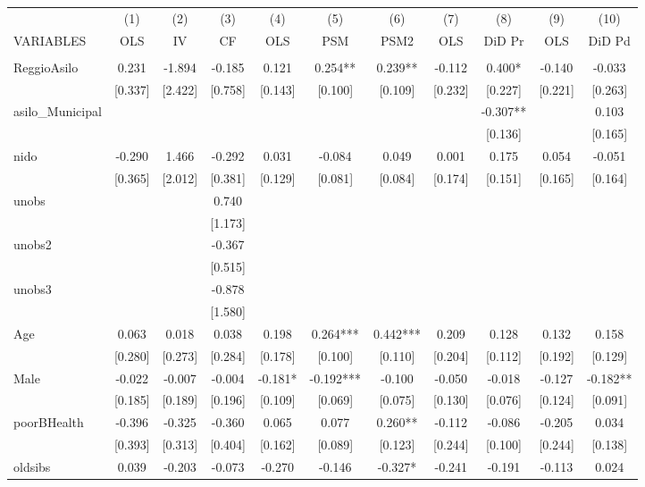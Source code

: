 \documentclass[]{article}
\begin{document}
\begin{tabular}{lcccccccccc} \hline
 & (1) & (2) & (3) & (4) & (5) & (6) & (7) & (8) & (9) & (10) \\
VARIABLES & OLS & IV & CF & OLS & PSM & PSM2 & OLS & DiD Pr & OLS & DiD Pd \\ \hline
 &  &  &  &  &  &  &  &  &  &  \\
ReggioAsilo & 0.231 & -1.894 & -0.185 & 0.121 & 0.254** & 0.239** & -0.112 & 0.400* & -0.140 & -0.033 \\
 & [0.337] & [2.422] & [0.758] & [0.143] & [0.100] & [0.109] & [0.232] & [0.227] & [0.221] & [0.263] \\
asilo\_Municipal &  &  &  &  &  &  &  & -0.307** &  & 0.103 \\
 &  &  &  &  &  &  &  & [0.136] &  & [0.165] \\
nido & -0.290 & 1.466 & -0.292 & 0.031 & -0.084 & 0.049 & 0.001 & 0.175 & 0.054 & -0.051 \\
 & [0.365] & [2.012] & [0.381] & [0.129] & [0.081] & [0.084] & [0.174] & [0.151] & [0.165] & [0.164] \\
unobs &  &  & 0.740 &  &  &  &  &  &  &  \\
 &  &  & [1.173] &  &  &  &  &  &  &  \\
unobs2 &  &  & -0.367 &  &  &  &  &  &  &  \\
 &  &  & [0.515] &  &  &  &  &  &  &  \\
unobs3 &  &  & -0.878 &  &  &  &  &  &  &  \\
 &  &  & [1.580] &  &  &  &  &  &  &  \\
Age & 0.063 & 0.018 & 0.038 & 0.198 & 0.264*** & 0.442*** & 0.209 & 0.128 & 0.132 & 0.158 \\
 & [0.280] & [0.273] & [0.284] & [0.178] & [0.100] & [0.110] & [0.204] & [0.112] & [0.192] & [0.129] \\
Male & -0.022 & -0.007 & -0.004 & -0.181* & -0.192*** & -0.100 & -0.050 & -0.018 & -0.127 & -0.182** \\
 & [0.185] & [0.189] & [0.196] & [0.109] & [0.069] & [0.075] & [0.130] & [0.076] & [0.124] & [0.091] \\
poorBHealth & -0.396 & -0.325 & -0.360 & 0.065 & 0.077 & 0.260** & -0.112 & -0.086 & -0.205 & 0.034 \\
 & [0.393] & [0.313] & [0.404] & [0.162] & [0.089] & [0.123] & [0.244] & [0.100] & [0.244] & [0.138] \\
oldsibs & 0.039 & -0.203 & -0.073 & -0.270 & -0.146 & -0.327* & -0.241 & -0.191 & -0.113 & 0.024 \\

\end{tabular}
\end{document}
